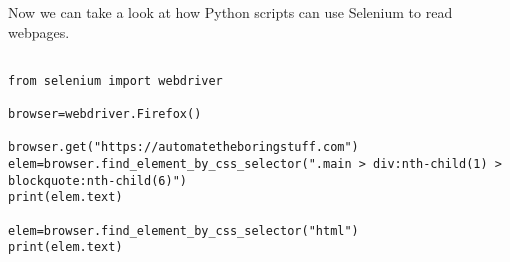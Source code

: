 \documentclass[11pt]{article}
\begin{document}
Now we can take a look at how Python scripts can use Selenium to read webpages.

\begin{verbatim}

from selenium import webdriver

browser=webdriver.Firefox()

browser.get("https://automatetheboringstuff.com")
elem=browser.find_element_by_css_selector(".main > div:nth-child(1) > blockquote:nth-child(6)")
print(elem.text)

elem=browser.find_element_by_css_selector("html")
print(elem.text)


\end{verbatim}
\end{document}
